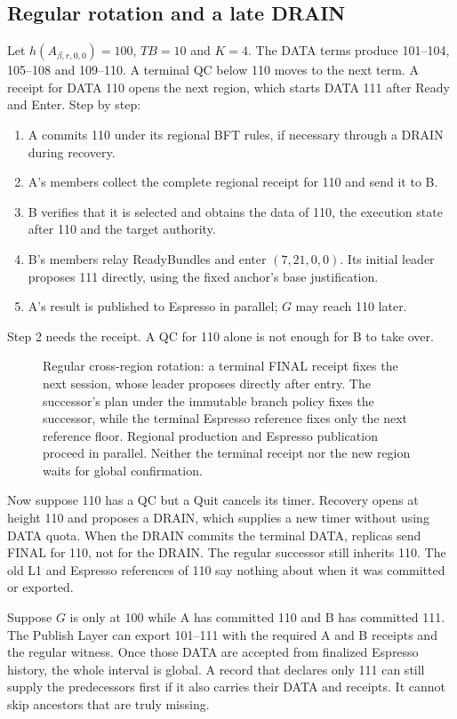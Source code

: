 \documentclass[11pt,a4paper]{article}
\newcommand{\TB}{\mathit{TB}}
\begin{document}
\subsection{Regular rotation and a late DRAIN}
\label{sec:regular-example}
Let $h(A_{\beta,r,0,0})=100$, $\TB=10$ and $K=4$. The DATA terms produce
101--104, 105--108 and 109--110. A terminal QC below 110 moves to the next
term. A receipt for DATA 110 opens the next region, which starts DATA 111
after Ready and Enter. Step by step:
\begin{enumerate}
\item A commits 110 under its regional BFT rules, if necessary through a
DRAIN during recovery.
\item A's members collect the complete regional receipt for 110 and send
it to B.
\item B verifies that it is selected and obtains the data of 110, the
execution state after 110 and the target authority.
\item B's members relay ReadyBundles and enter $(7,21,0,0)$.
Its initial leader proposes 111 directly, using the fixed anchor's
base justification.
\item A's result is published to Espresso in parallel; $G$ may reach 110
later.
\end{enumerate}
Step 2 needs the receipt. A QC for 110 alone is not enough for B to take
over.

\begin{figure}[htbp]\centering

\caption{Regular cross-region rotation: a terminal FINAL receipt fixes
the next session, whose leader proposes directly after entry. The successor's plan under the immutable branch policy fixes the successor, while
the terminal Espresso reference fixes only the next reference floor.
Regional production and Espresso publication proceed in parallel. Neither
the terminal receipt nor the new region waits for global confirmation.}
\label{fig:regular-cross-region}
\end{figure}
\FloatBarrier

Now suppose 110 has a QC but a Quit cancels its timer. Recovery opens at
height 110 and proposes a DRAIN, which supplies a new timer without using
DATA quota. When the DRAIN commits the terminal DATA, replicas send FINAL
for 110, not for the DRAIN. The regular successor still inherits 110. The
old L1 and Espresso references of 110 say nothing about when it was
committed or exported.

Suppose $G$ is only at 100 while A has committed 110 and B has committed
111. The Publish Layer can export 101--111 with the required A and B
receipts and the regular witness. Once those DATA are accepted from
finalized Espresso history, the whole interval is global. A record that
declares only 111 can still supply the predecessors first if it also
carries their DATA and receipts. It cannot skip ancestors that are truly
missing.
\end{document}
